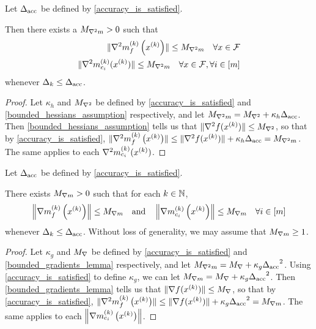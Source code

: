 \begin{lemma}
\label{bounded_model_hessian_lemma}
Let ${\Delta_{\textrm{acc}}}$ be defined by \cref{accuracy_is_satisfied}.



Then there exists a ${M_{\nabla^2 m}} > 0$ such that 
\begin{align*}
\| {\nabla^2m_f^{(k)}\left(x^{(k)}\right)} \| \le {M_{\nabla^2 m}} \quad \forall x \in {\mathcal F} \\
\|\nabla^2 m_{c_i}^{(k)}(x^{(k)}) \| \le {M_{\nabla^2 m}} \quad \forall x \in {\mathcal F}, \forall i \in [m]
\end{align*}
whenever $\Delta_k \le {\Delta_{\textrm{acc}}}$.
\end{lemma}

\begin{proof}
Let $\kappa_h$ and ${M_{\nabla^2}}$ be defined by \cref{accuracy_is_satisfied} and \cref{bounded_hessians_assumption} respectively,
and let ${M_{\nabla^2 m}} = {M_{\nabla^2}} + \kappa_h {\Delta_{\textrm{acc}}}$.
Then \cref{bounded_hessians_assumption} tells us that
$\|\nabla^2 f(x^{(k)})\| \le {M_{\nabla^2}}$, so that by \cref{accuracy_is_satisfied},
$\|{\nabla^2m_f^{(k)}\left(x^{(k)}\right)}\| \le \|\nabla^2 f(x^{(k)})\| + \kappa_h{\Delta_{\textrm{acc}}} = {M_{\nabla^2 m}}$.
The same applies to each $\nabla^2 m_{c_i}^{(k)}(x^{(k)})$.
\end{proof}

\begin{lemma}
\label{i_thought_i_proved_this_already}
Let ${\Delta_{\textrm{acc}}}$ be defined by \cref{accuracy_is_satisfied}.




There exists ${M_{\nabla m}} > 0$ such that for each $k \in \mathbb N$, 
\begin{align*}
\left\| {\nabla m_f^{(k)}\left(x^{(k)}\right)} \right\| \le {M_{\nabla m}} \quad
\textrm{and} \quad \left\|{\nabla m_{c_i}^{(k)}\left(x^{(k)}\right)}\right\| \le {M_{\nabla m}} \quad \forall i \in [m]
\end{align*}
whenever $\Delta_k \le {\Delta_{\textrm{acc}}}$.
Without loss of generality, we may assume that ${M_{\nabla m}} \ge 1$.
\end{lemma}
\begin{proof}
Let $\kappa_g$ and ${M_{\nabla}}$ be defined by \cref{accuracy_is_satisfied} and \cref{bounded_gradients_lemma} respectively,
and let ${M_{\nabla^2 m}} = {M_{\nabla}} + \kappa_g {\Delta_{\textrm{acc}}}^2$.
Using \cref{accuracy_is_satisfied} to define $\kappa_g$, we can let ${M_{\nabla m}} = {M_{\nabla}} + \kappa_g {\Delta_{\textrm{acc}}}^2$.
Then \cref{bounded_gradients_lemma} tells us that
$\|\nabla f(x^{(k)})\| \le {M_{\nabla}}$, so that by \cref{accuracy_is_satisfied},
$\|{\nabla^2m_f^{(k)}\left(x^{(k)}\right)}\| \le \|\nabla f(x^{(k)})\| + \kappa_g{\Delta_{\textrm{acc}}}^2 = {M_{\nabla m}}$.
The same applies to each $\left\|{\nabla m_{c_i}^{(k)}\left(x^{(k)}\right)}\right\|$.
\end{proof}


